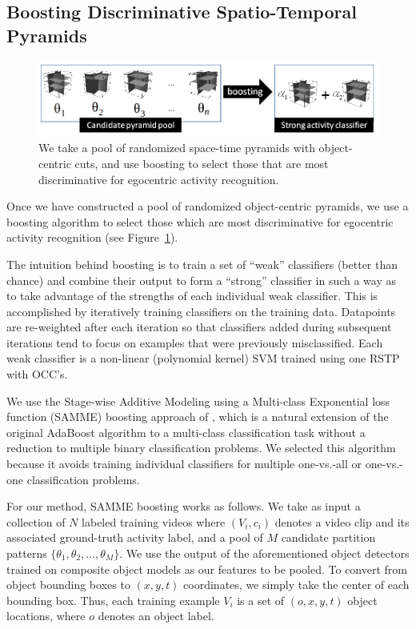 \documentclass[12pt]{article} %
\begin{document}
  \subsection{Boosting Discriminative Spatio-Temporal Pyramids}
  
\begin{figure}[t]
  \begin{center}
\includegraphics[width=13cm]{figures/concept-alg.png}
		   \caption{We take a pool of randomized space-time pyramids with object-centric cuts, and use boosting to select those that are most discriminative for egocentric activity recognition.}
\label{fig:concept-alg}
  \end{center}
\end{figure}


  Once we have constructed a pool of randomized object-centric pyramids, we use a
  boosting algorithm to select those which are most discriminative for egocentric
  activity recognition (see Figure~\ref{fig:concept-alg}).
 
  The intuition behind boosting is to train a set of ``weak'' classifiers (better
  than chance) and
  combine their output to form a ``strong'' classifier in such a way as to take advantage of the strengths
  of each individual weak classifier.
  This is accomplished by iteratively training classifiers on the training data.
  Datapoints are re-weighted after each iteration so that classifiers added during
  subsequent iterations tend to focus on examples that were previously
  misclassified. Each weak classifier is a non-linear (polynomial kernel) SVM
  trained using one RSTP with OCC's. 
  
  We use the Stage-wise Additive Modeling using a
  Multi-class Exponential loss function (SAMME) boosting approach of
  \cite{Zhu06}, which is a natural extension of the original AdaBoost algorithm
  to a multi-class classification task without a reduction to multiple binary
  classification problems. We selected this algorithm because it avoids training
  individual classifiers for multiple one-vs.-all or one-vs.-one classification
  problems.

	For our method, SAMME boosting works as follows. We take as input a collection of $N$ labeled training videos 
  where $(V_i, c_i)$ denotes a video clip and its associated ground-truth
  activity label,
	and a pool of $M$ candidate partition patterns 
  $\{\theta_1, \theta_2, ..., \theta_M\}$.
  We use the output of the
  aforementioned object detectors trained on composite object models as our features to be
  pooled. To convert from object bounding boxes to $(x,y,t)$ coordinates, we
  simply take the center of each bounding box.
  Thus, each training example $V_i$ is a set of $(o,x,y,t)$ object
  locations, where $o$ denotes an object label.
\end{document}
